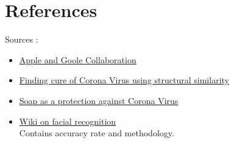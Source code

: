\documentclass[10pt,twocolumn,letterpaper]{article}
\begin{document}
\section*{References}
Sources :
\begin{itemize}
    \item \href{https://www.apple.com/in/newsroom/2020/04/apple-and-google-partner-on-covid-19-contact-tracing-technology/}{Apple and Goole Collaboration}
    \item \href{https://science.sciencemag.org/content/368/6489/409}{Finding cure of Corona Virus using structural similarity}
    \item \href{https://www.thehindu.com/sci-tech/science/how-does-soap-use-help-in-tackling-covid-19/article31070630.ece}{Soap as a protection against Corona Virus}
    \item \href{https://en.wikipedia.org/wiki/Facial_recognition_system}{Wiki on facial recognition}\\
    Contains accuracy rate and methodology.
\end{itemize}
\end{document}
